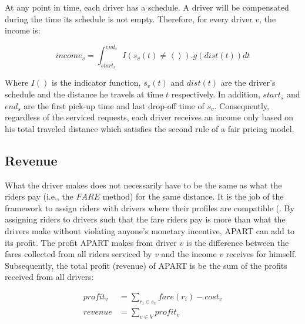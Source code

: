 At any point in time, each driver has a schedule. A driver will be compensated during the time its schedule is not empty. Therefore, for every driver $v$, the income is:

\begin{equation}
\label{eq:payment}
income_v = \int_{start_s}^{end_s} I\left( s_v(t) \neq \left\langle \right\rangle\right).g(dist(t))dt
\end{equation}

\noindent Where $I()$ is the indicator function, $s_v(t)$ and $dist(t)$ are the driver's schedule and the distance he travels at time $t$ respectively. In addition, $start_s$ and $end_s$ are the first pick-up time and last drop-off time of $s_v$. Consequently, regardless of the serviced requests, each driver receives an income only based on his total traveled distance which satisfies the second rule of a fair pricing model.

\subsection{Revenue}

What the driver makes does not necessarily have to be the same as what the riders pay (i.e., the $FARE$ method) for the same distance. It is the job of the framework to assign riders with drivers where their profiles are compatible (. By assigning riders to drivers such that the fare riders pay is more than what the drivers make without violating anyone's monetary incentive, APART can add to its profit. The profit APART makes from driver $v$ is the difference between the fares collected from all riders serviced by $v$ and the income $v$ receives for himself. Subsequently, the total profit (revenue) of APART is be the sum of the profits received from all drivers:

\begin{align}
\label{eq:profit} 
profit_v &= \sum_{r_i \in s_v}fare(r_i) - cost_v\\
revenue &= \sum_{v \in V}profit_v
\end{align}

